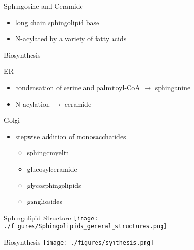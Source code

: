 \documentclass[presentation, smaller]{beamer}
\begin{document}
\begin{frame}[label={sec:orgheadline2}]{Sphingosine and Ceramide}
\begin{itemize}
\item long chain sphingolipid base
\item N-acylated by a variety of fatty acids
\end{itemize}
\centering
{}
\end{frame}



\begin{frame}[label={sec:orgheadline3}]{Biosynthesis}
\begin{block}{ER}
\begin{itemize}
\item condensation of serine and palmitoyl-CoA \(\to\) sphinganine
\item N-acylation \(\to\) ceramide
\end{itemize}
\end{block}

\begin{block}{Golgi}
\begin{itemize}
\item stepwise addition of monosaccharides
\begin{itemize}
\item sphingomyelin
\item glucosylceramide
\item glycosphingolipids
\item gangliosides
\end{itemize}
\end{itemize}
\end{block}
\end{frame}


\begin{frame}[label={sec:orgheadline4}]{Sphingolipid Structure}
\texttt{[image: ./figures/Sphingolipids\_general\_structures.png]}
\end{frame}

\begin{frame}[label={sec:orgheadline5}]{Biosynthesis}
\centering
\texttt{[image: ./figures/synthesis.png]}
\end{frame}
\end{document}
